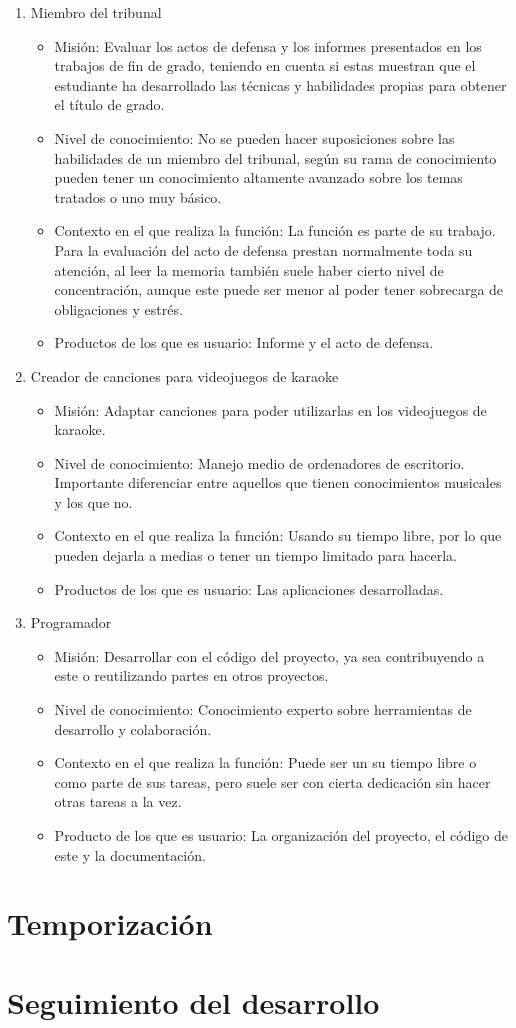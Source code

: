 \begin{enumerate}	
	\item{Miembro del tribunal}
	\begin{itemize}
		\item{Misión: Evaluar los actos de defensa y los informes presentados en los trabajos de fin de grado, teniendo en cuenta si estas muestran que el estudiante ha desarrollado las técnicas y habilidades propias para obtener el título de grado.}
		\item{Nivel de conocimiento: No se pueden hacer suposiciones sobre las habilidades de un miembro del tribunal, según su rama de conocimiento pueden tener un conocimiento altamente avanzado sobre los temas tratados o uno muy básico.}
		\item{Contexto en el que realiza la función: La función es parte de su trabajo. Para la evaluación del acto de defensa prestan normalmente toda su atención, al leer la memoria también suele haber cierto nivel de concentración, aunque este puede ser menor al poder tener sobrecarga de obligaciones y estrés.}
		\item{Productos de los que es usuario: Informe y el acto de defensa.}
	\end{itemize}
	
	\item{Creador de canciones para videojuegos de karaoke}
	\begin{itemize}
		\item{Misión: Adaptar canciones para poder utilizarlas en los videojuegos de karaoke.}
		\item{Nivel de conocimiento: Manejo medio de ordenadores de escritorio. Importante diferenciar entre aquellos que tienen conocimientos musicales y los que no.}
		\item{Contexto en el que realiza la función: Usando su tiempo libre, por lo que pueden dejarla a medias o tener un tiempo limitado para hacerla.}
		\item{Productos de los que es usuario: Las aplicaciones desarrolladas.}
	\end{itemize}
	
		\item{Programador}
	\begin{itemize}
		\item{Misión: Desarrollar con el código del proyecto, ya sea contribuyendo a este o reutilizando partes en otros proyectos.}
		\item{Nivel de conocimiento: Conocimiento experto sobre herramientas de desarrollo y colaboración.}
		\item{Contexto en el que realiza la función: Puede ser un su tiempo libre o como parte de sus tareas, pero suele ser con cierta dedicación sin hacer otras tareas a la vez.}
		\item{Producto de los que es usuario: La organización del proyecto, el código de este y la documentación.}
	\end{itemize}
\end{enumerate}




\section{Temporización}

\section{Seguimiento del desarrollo}
